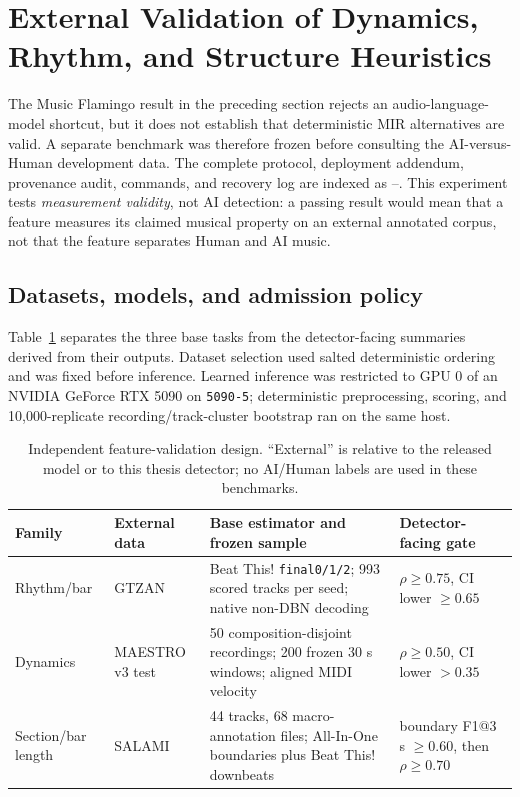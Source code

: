 \section{External Validation of Dynamics, Rhythm, and Structure Heuristics}
\label{sec:external-mir-benchmark}

The Music Flamingo result in the preceding section rejects an audio-language-model shortcut, but it does not establish that deterministic MIR alternatives are valid. A separate benchmark was therefore frozen before consulting the AI-versus-Human development data. The complete protocol, deployment addendum, provenance audit, commands, and recovery log are indexed as --. This experiment tests \emph{measurement validity}, not AI detection: a passing result would mean that a feature measures its claimed musical property on an external annotated corpus, not that the feature separates Human and AI music.

\subsection{Datasets, models, and admission policy}

Table~\ref{tab:external-mir-design} separates the three base tasks from the detector-facing summaries derived from their outputs. Dataset selection used salted deterministic ordering and was fixed before inference. Learned inference was restricted to GPU 0 of an NVIDIA GeForce RTX 5090 on \texttt{5090-5}; deterministic preprocessing, scoring, and 10,000-replicate recording/track-cluster bootstrap ran on the same host.

\begin{table}[H]
\centering
\caption{Independent feature-validation design. ``External'' is relative to the released model or to this thesis detector; no AI/Human labels are used in these benchmarks.}
\label{tab:external-mir-design}
\begin{tabularx}{\linewidth}{p{24mm}p{32mm}X p{28mm}}
\toprule
Family & External data & Base estimator and frozen sample & Detector-facing gate \\
\midrule
Rhythm/bar & GTZAN & Beat This! \texttt{final0/1/2}; 993 scored tracks per seed; native non-DBN decoding \citep{beatthisrepo2026} & $\rho\geq0.75$, CI lower $\geq0.65$ \\
Dynamics & MAESTRO v3 test & 50 composition-disjoint recordings; 200 frozen 30 s windows; aligned MIDI velocity \citep{maestrodataset2026} & $\rho\geq0.50$, CI lower $>0.35$ \\
Section/bar length & SALAMI & 44 tracks, 68 macro-annotation files; All-In-One boundaries plus Beat This! downbeats \citep{salamirepo2026,allinonerepo2026} & boundary F1@3 s $\geq0.60$, then $\rho\geq0.70$ \\
\bottomrule
\end{tabularx}
\end{table}

